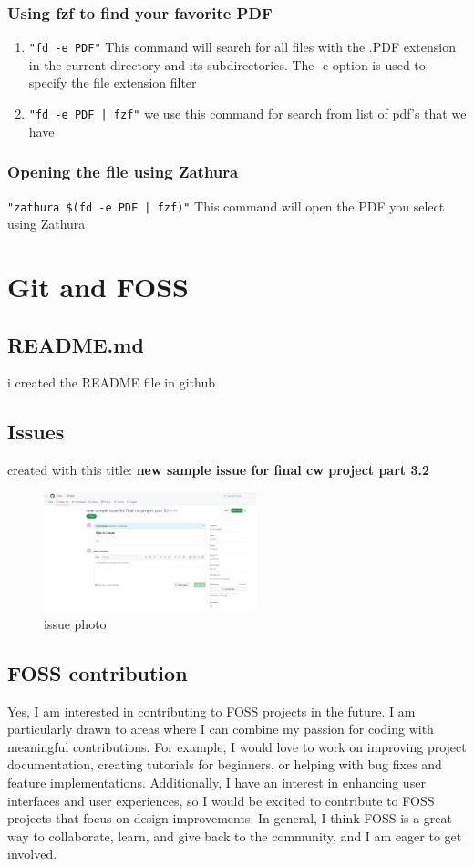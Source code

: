 \documentclass[titlepage]{article}
\begin{document}
\subsubsection{Using fzf to find your favorite PDF}

\begin{enumerate}
    \item \texttt{"fd -e PDF"}
This command will search for all files with the .PDF extension in the current directory and its subdirectories. The -e option is used to specify the file extension filter
    \item \texttt{"fd -e PDF | fzf"} we use this command for search from list of pdf's that we have
\end{enumerate}

\subsubsection{Opening the file using Zathura}
\texttt{"zathura \$(fd -e PDF | fzf)"} This command will open the PDF you select using Zathura

\section{Git and FOSS}
\subsection{README.md}
i created the README file in github

\subsection{Issues}
created with this title: \textbf{new sample issue for final cw project part 3.2}
\begin{figure}[h]
    \centering
    \includegraphics[width=0.55\textwidth]{screenshot.png}
    \caption{issue photo}
\end{figure}

\subsection{FOSS contribution}
Yes, I am interested in contributing to FOSS projects in the future. I am particularly drawn to areas where I can combine my passion for coding with meaningful contributions. For example, I would love to work on improving project documentation, creating tutorials for beginners, or helping with bug fixes and feature implementations. Additionally, I have an interest in enhancing user interfaces and user experiences, so I would be excited to contribute to FOSS projects that focus on design improvements. In general, I think FOSS is a great way to collaborate, learn, and give back to the community, and I am eager to get involved.
\end{document}
